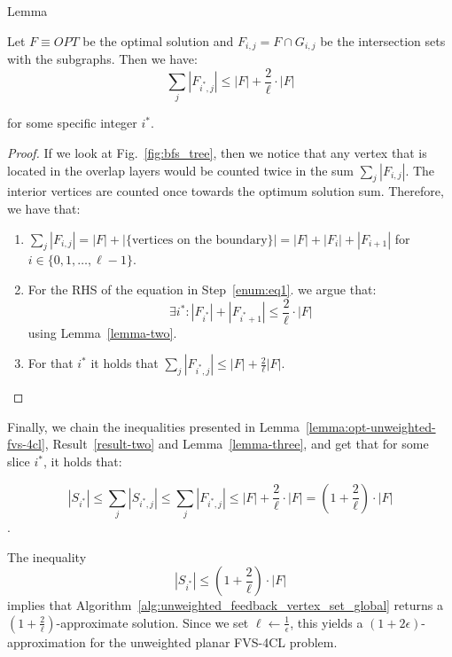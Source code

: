 \begin{mydefinition}{Lemma}
    \label{lemma-three}

    Let $F \equiv OPT$ be the optimal solution and $F_{i, j} = F \cap G_{i, j}$ be the intersection 
    sets with the subgraphs. Then we have: 
    \[\sum\limits_{j} |F_{i^*, j}| \leq |F| + \frac{2}{\ell} \cdot |F|\]

    for some specific integer $i^*$.

\end{mydefinition}

\begin{proof}
    
If we look at Fig.~\ref{fig:bfs_tree}, then we notice that any vertex that is located 
in the overlap layers would be counted twice in the sum $\sum\limits_{j} |F_{i, j}|$. The interior 
vertices are counted once towards the optimum solution sum. Therefore, we have that: 

\begin{enumerate}
    \item $\sum\limits_{j} |F_{i, j}| = |F| + |\{\text{vertices on the boundary}\}| = |F| + |F_i| + |F_{i+1}|$
    for $i \in \{0, 1, \dots, \ell-1\}$. \label{enum:eq1}
    \item For the RHS of the equation in Step~\ref{enum:eq1}. we argue that:
    \[\exists i^*: |F_{i^*}| + |F_{i^*+1}| \leq \frac{2}{\ell} \cdot |F|\] using Lemma~\ref{lemma-two}.
    \item For that $i^*$ it holds that $\sum\limits_{j} |F_{i^*, j}| \leq |F| + \frac{2}{\ell} |F|$.
\end{enumerate}

\end{proof}

Finally, we chain the inequalities presented in Lemma~\ref{lemma:opt-unweighted-fvs-4cl}, Result~\ref{result-two}
and Lemma~\ref{lemma-three}, and get that for some slice $i^*$, it holds that:

\[|S_{i^*}| \leq \sum\limits_{j} |S_{i^*, j}| \leq \sum\limits_{j} |F_{i^*, j}| \leq |F| + \frac{2}{\ell} \cdot |F| = (1 + \frac{2}{\ell}) \cdot |F|\].

The inequality
\[
|S_{i^*}| \leq \left(1 + \frac{2}{\ell} \right) \cdot |F|
\]
implies that Algorithm~\ref{alg:unweighted_feedback_vertex_set_global} returns a 
\(\left(1 + \frac{2}{\ell}\right)\)-approximate solution. Since we set \(\ell \leftarrow \frac{1}{\epsilon}\), 
this yields a \((1 + 2\epsilon)\)-approximation for the unweighted planar FVS-4CL problem.


